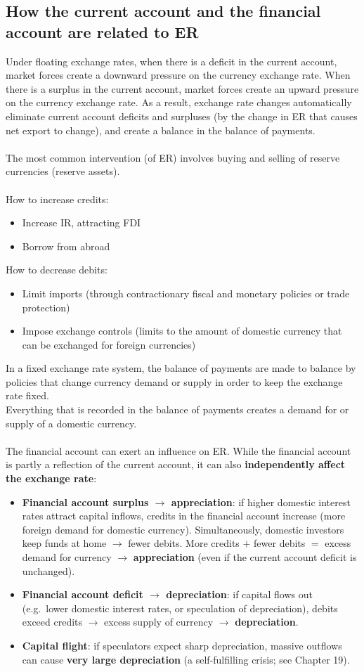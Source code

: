 \subsection{How the current account and the financial account are related to ER}
Under floating exchange rates, when there is a deficit in the current account, market forces create a downward pressure on the currency exchange rate. When there is a surplus in the current account, market forces create an upward pressure on the currency exchange rate. As a result, exchange rate changes automatically eliminate current account deficits and surpluses (by the change in ER that causes net export to change), and create a balance in the balance of payments.\\\\
The most common intervention (of ER) involves buying and selling of reserve currencies (reserve assets). \\\\
How to increase credits:
\begin{itemize}
  \item Increase IR, attracting FDI
  \item Borrow from abroad
\end{itemize}
How to decrease debits:
\begin{itemize}
  \item Limit imports (through contractionary fiscal and monetary policies or trade protection)
  \item Impose exchange controls (limits to the amount of domestic currency that can be exchanged for foreign currencies)
\end{itemize}
In a fixed exchange rate system, the balance of payments are made to balance by policies that change currency demand or supply in order to keep the exchange rate fixed.\\
Everything that is recorded in the balance of payments creates a demand for or supply of a domestic currency.\\\\
The financial account can exert an influence on ER. While the financial account is partly a reflection of the current account, it can also \textbf{independently affect the exchange rate}:
\begin{itemize}
  \item \textbf{Financial account surplus $\to$ appreciation}: if higher domestic interest rates attract capital inflows, credits in the financial account increase (more foreign demand for domestic currency). Simultaneously, domestic investors keep funds at home $\to$ fewer debits. More credits $+$ fewer debits $=$ excess demand for currency $\to$ \textbf{appreciation} (even if the current account deficit is unchanged).
  \item \textbf{Financial account deficit $\to$ depreciation}: if capital flows out (e.g.\ lower domestic interest rates, or speculation of depreciation), debits exceed credits $\to$ excess supply of currency $\to$ \textbf{depreciation}.
  \item \textbf{Capital flight}: if speculators expect sharp depreciation, massive outflows can cause \textbf{very large depreciation} (a self-fulfilling crisis; see Chapter 19).
\end{itemize}
